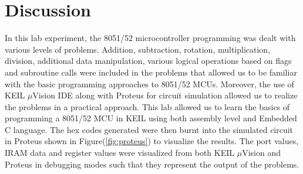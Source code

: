 \documentclass{lab_sheet}
\begin{document}
\section{Discussion}
In this lab experiment, the 8051/52 microcontroller programming was dealt 
with various levels of problems. Addition, subtraction, 
rotation, multiplication, division, additional data manipulation, 
various logical operations based on flags and subroutine calls were 
included in the problems that allowed us to be familiar with the basic
 programming approaches to 8051/52 MCUs.
  Moreover, the use of KEIL $\mu$Vision IDE along with Proteus for circuit simulation 
  allowed us to realize the problems in a practical approach. This lab allowed us to 
  learn the basics of programming a 8051/52 MCU in KEIL using both assembly level and
   Embedded C language. The hex codes generated were then burnt into the simulated circuit 
   in Proteus shown in Figure(\ref{fig:proteus}) to visualize the results. 
   The port values, IRAM data and register values were visualized from both 
   KEIL $\mu$Vision and Proteus in debugging modes such that they represent 
   the output of the problems.
\printbibliography[heading=bibintoc,title={Bibliography}, category=cited]
\printbibliography[heading=bibintoc,title={Additional References},notcategory=cited]
\end{document}
